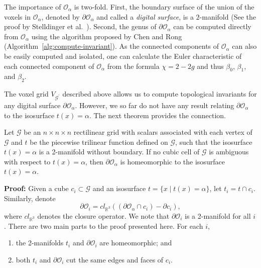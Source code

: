 The importance of $\mathcal{O}_\alpha$ is two-fold. First, the
boundary surface of the union of the voxels in $\mathcal{O}_\alpha$,
denoted by $\partial\mathcal{O}_\alpha$ and called a \emph{digital
  surface}, is a $2$-manifold (See the proof by Stelldinger et
al.~\cite{siqueira:2007}). Second, the genus of
$\partial\mathcal{O}_\alpha$ can be computed directly from
$\mathcal{O}_\alpha$ using the algorithm proposed by Chen and Rong
\cite{LiChen:2008} (Algorithm~\ref{alg:compute-invariant}). As the
connected components of $\mathcal{O}_\alpha$ can also be easily
computed and isolated, one can calculate the Euler characteristic of
each connected component of $\mathcal{O}_\alpha$ from the formula
$\chi = 2 - 2g$ and thus $\beta_0$, $\beta_1$, and $\beta_2$.

The voxel grid $V_{\mathcal{G^\prime}}$ described above allows us to
compute topological invariants for any digital surface
$\partial\mathcal{O}_\alpha$. However, we so far do not have any
result relating $\partial\mathcal{O}_\alpha$ to the isosurface
$t(x)=\alpha$.  The next theorem provides the connection.

\begin{thm}
Let $\mathcal{G}$ be an $n\times n\times n$ rectilinear grid with scalars
associated with each vertex of $\mathcal{G}$ and $t$ be the piecewise trilinear 
function defined on $\mathcal{G}$, such that the isosurface $t(x)=\alpha$ is a
2-manifold without boundary. If no cubic cell of $\mathcal{G}$ is
ambiguous with respect to $t(x)=\alpha$, then $\partial\mathcal{O}_\alpha$
is homeomorphic to the isosurface $t(x)=\alpha$.
\label{thm:topological_equivalence_trilinear}
\end{thm}
{\bf Proof:} Given a cube $c_i \subset \mathcal{G}$ and an isosurface
 $t = \{x \;|\; t(x) = \alpha\}$, let $t_i = t \cap c_i$.  Similarly,
denote
\[\partial \mathcal{O}_i =  cl_{\mathbb{R}^3} \left( (\partial \mathcal{O}_\alpha \cap c_i) - \partial c_i  \right),\]
where $cl_{\mathbb{R}^3}$ denotes the closure operator. We note that
$\partial \mathcal{O}_i$ is a 2-manifold for all $i$
\cite{SPB04,siqueira:2007}.  There are two main parts to the proof
presented here. For each $i$,
\begin{enumerate}
\item the 2-manifolds $t_i$ and $\partial \mathcal{O}_i$ are homeomorphic; and
\item both $t_i$ and $\partial \mathcal{O}_i$ cut the same edges and faces of $c_i$.
\end{enumerate}

